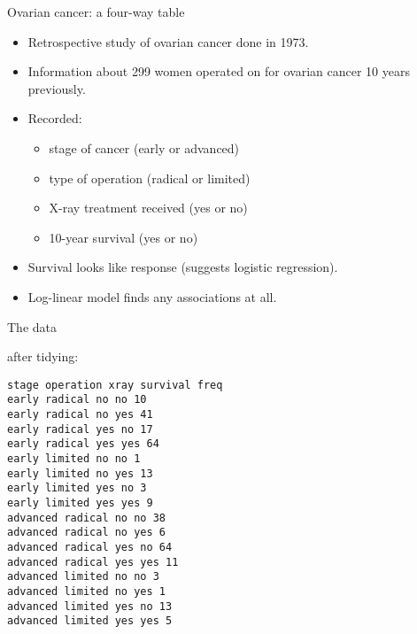 \begin{frame}[fragile]{Ovarian cancer: a four-way table}

  \begin{itemize}
  \item Retrospective study of ovarian cancer done in 1973.
  \item Information about 299 women operated on for ovarian cancer 10 years previously.
  \item Recorded:
    \begin{itemize}
    \item stage of cancer (early or advanced)
    \item type of operation (radical or limited)
    \item X-ray treatment received (yes or no)
    \item 10-year survival (yes or no)
    \end{itemize}
  \item Survival looks like response (suggests logistic
    regression).

  \item Log-linear model finds any associations at all.
  \end{itemize}
  
\end{frame}

 
\begin{frame}[fragile]{The data}

after tidying:

{\scriptsize
\begin{verbatim}
stage operation xray survival freq
early radical no no 10
early radical no yes 41
early radical yes no 17
early radical yes yes 64
early limited no no 1
early limited no yes 13
early limited yes no 3
early limited yes yes 9
advanced radical no no 38
advanced radical no yes 6
advanced radical yes no 64
advanced radical yes yes 11
advanced limited no no 3
advanced limited no yes 1
advanced limited yes no 13
advanced limited yes yes 5

\end{verbatim}
}

\end{frame}

